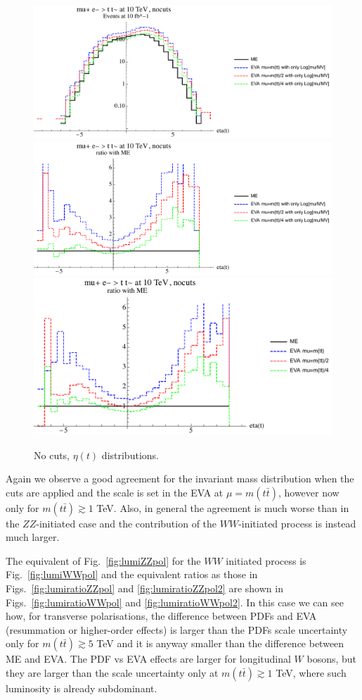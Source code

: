 \documentclass[a4paper,11pt]{article}
\begin{document}
\begin{figure}[!t]
\includegraphics[width=0.46\linewidth]{Notebooks/PlotDistr/WW_tt/10TeVnocuts/plotetat.pdf}
\includegraphics[width=0.46\linewidth]{Notebooks/PlotDistr/WW_tt/10TeVnocuts/plotetatratio1.pdf}
\includegraphics[width=0.46\linewidth]{Notebooks/PlotDistr/WW_tt/10TeVnocuts/plotetatratio2.pdf}
\caption{No cuts, $\eta(t)$ distributions. \label{fig:nocutsWWtt2}}
\end{figure}


Again we observe a good agreement for the invariant mass distribution when the cuts are applied and the scale is set in the EVA at $\mu=m(t \bar t)$, however now only for $m(t \bar t) \gtrsim 1 $ TeV. Also, in general the agreement is much worse than in the $ZZ$-initiated case and the contribution of the $WW$-initiated process is instead much larger. 

The equivalent of Fig.~\ref{fig:lumiZZpol} for the $WW$ initiated process is Fig.~\ref{fig:lumiWWpol} and the equivalent ratios as those in Figs.~\ref{fig:lumiratioZZpol} and \ref{fig:lumiratioZZpol2} are shown in Figs.~\ref{fig:lumiratioWWpol} and \ref{fig:lumiratioWWpol2}. In this case we can see how, for transverse polarisations, the difference between PDFs and EVA (resummation or higher-order effects) is larger than the PDFs scale uncertainty only for  $m(t \bar t) \gtrsim 5 $ TeV and it is anyway smaller than the difference between ME and EVA. The PDF vs EVA effects are larger for longitudinal $W$ bosons, but they are larger than the scale uncertainty only at  $m(t \bar t) \gtrsim 1 $ TeV, where such luminosity is already subdominant.  
\end{document}
